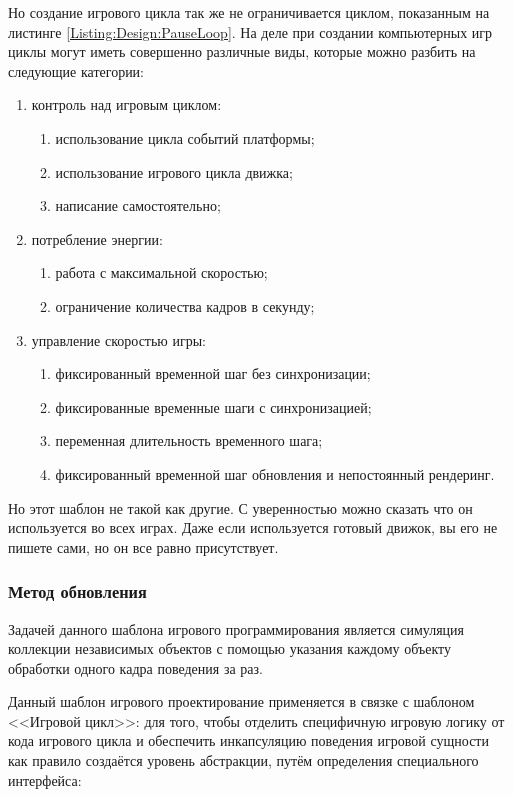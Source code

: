 Но создание игрового цикла так же не ограничивается циклом, показанным на листинге \ref{Listing:Design:PauseLoop}. На деле при создании компьютерных игр циклы могут иметь совершенно различные виды, которые можно разбить на следующие категории:
\begin{enumerate}
    \item контроль над игровым циклом:
    \begin{enumerate}
        \item использование цикла событий платформы;
        \item использование игрового цикла движка;
        \item написание самостоятельно;
    \end{enumerate}
    \item потребление энергии:
    \begin{enumerate}
        \item работа с максимальной скоростью;
        \item ограничение количества кадров в секунду;
    \end{enumerate}
    \item управление скоростью игры:
    \begin{enumerate}
        \item фиксированный временной шаг без синхронизации;
        \item фиксированные временные шаги с синхронизацией;
        \item переменная длительность временного шага;
        \item фиксированный временной шаг обновления и непостоянный рендеринг.
    \end{enumerate}
\end{enumerate}

Но этот шаблон не такой как другие. С уверенностью можно сказать что он используется во всех играх. Даже если используется готовый движок, вы его не пишете сами, но он все равно присутствует.


\subsubsection{Метод обновления}

Задачей данного шаблона игрового программирования является симуляция коллекции независимых объектов с помощью указания каждому объекту обработки одного кадра поведения за раз.

Данный шаблон игрового проектирование применяется в связке с шаблоном <<Игровой цикл>>: для того, чтобы отделить специфичную игровую логику от кода игрового цикла и обеспечить инкапсуляцию поведения игровой сущности как правило создаётся уровень абстракции, путём определения специального интерфейса:

